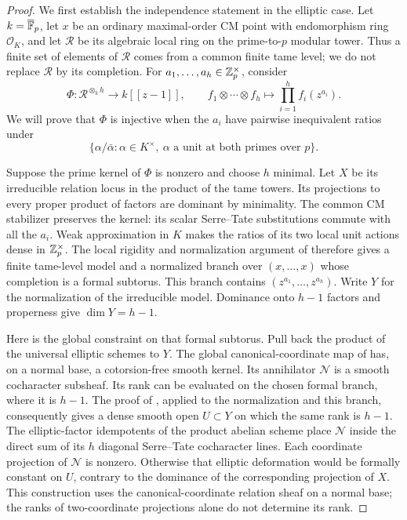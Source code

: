 \begin{proof}
We first establish the independence statement in the elliptic case.
Let \(k=\overline{\mathbb F}_p\), let \(x\) be an ordinary maximal-order
CM point with endomorphism ring \(\mathcal O_K\), and let \(\mathscr R\)
be its algebraic local ring on the prime-to-\(p\) modular tower.
Thus a finite set of elements of \(\mathscr R\) comes from a common
finite tame level; we do not replace \(\mathscr R\) by its completion.
For \(a_1,\ldots,a_h\in\mathbb Z_p^\times\), consider
\[
 \Phi:\mathscr R^{\otimes_k h}\longrightarrow k[[z-1]],\qquad
 f_1\otimes\cdots\otimes f_h\longmapsto
       \prod_{i=1}^h f_i(z^{a_i}).
\]
We will prove that \(\Phi\) is injective when the \(a_i\) have
pairwise inequivalent ratios under
\[
 \{\alpha/\bar\alpha:
        \alpha\in K^\times,\ \alpha\text{ a unit at both primes over }p\}.
\]

Suppose the prime kernel of \(\Phi\) is nonzero and choose \(h\)
minimal.  Let \(X\) be its irreducible relation locus in the product
of the tame towers.  Its projections to every proper product of
factors are dominant by minimality.  The common CM stabilizer
preserves the kernel: its scalar Serre--Tate substitutions commute
with all the \(a_i\).  Weak approximation in \(K\) makes the ratios
of its two local unit actions dense in \(\mathbb Z_p^\times\).  The local
rigidity and normalization argument
of \cite[Proposition~3.11 and Corollary~3.13]{HidaMu} therefore gives
a finite tame-level model and a normalized branch over
\((x,\ldots,x)\) whose completion is a formal subtorus.  This branch
contains \((z^{a_1},\ldots,z^{a_h})\).  Write \(Y\) for the
normalization of the irreducible model.  Dominance onto \(h-1\)
factors and properness give \(\dim Y=h-1\).

Here is the global constraint on that formal subtorus.  Pull back the
product of the universal elliptic schemes to \(Y\).  The global
canonical-coordinate map of \cite[Sections~2 and~5]{ChaiOrd} has,
on a normal base, a cotorsion-free smooth kernel.  Its annihilator
\(\mathscr N\) is a smooth cocharacter subsheaf.  Its rank can be
evaluated on the chosen formal branch, where it is \(h-1\).
The proof of \cite[Proposition~5.3]{ChaiOrd}, applied to the
normalization and this branch, consequently gives a dense smooth
open \(U\subset Y\) on which the same rank is \(h-1\).
The elliptic-factor idempotents of the product abelian scheme place
\(\mathscr N\) inside the direct sum of its \(h\) diagonal
Serre--Tate cocharacter lines.  Each coordinate projection of
\(\mathscr N\) is nonzero.  Otherwise that elliptic deformation
would be formally constant on \(U\), contrary to the dominance of
the corresponding projection of \(X\).  This construction uses the
canonical-coordinate relation sheaf on a normal base; the ranks of
two-coordinate projections alone do not determine its rank.


\end{proof}
